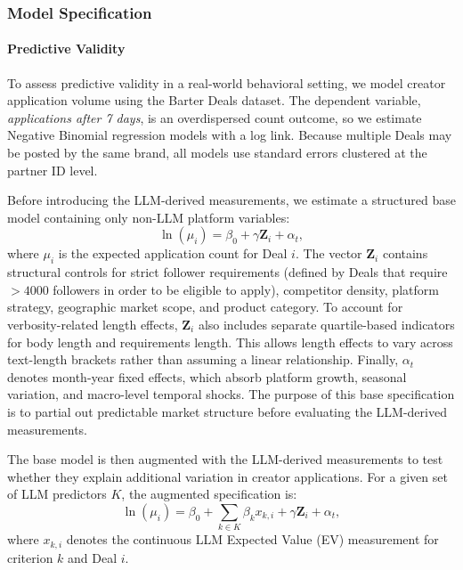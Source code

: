\subsubsection{Model Specification}

\paragraph{Predictive Validity}
To assess predictive validity in a real-world behavioral setting, we model creator application volume using the Barter Deals dataset. The dependent variable, \textit{applications after 7 days}, is an overdispersed count outcome, so we estimate Negative Binomial regression models with a log link. Because multiple Deals may be posted by the same brand, all models use standard errors clustered at the partner ID level.

Before introducing the LLM-derived measurements, we estimate a structured base model containing only non-LLM platform variables:
\begin{equation}\label{eq:barter_base_regression}
    \ln(\mu_i) = \beta_0 + \gamma \mathbf{Z}_i + \alpha_t,
\end{equation}
where $\mu_i$ is the expected application count for Deal $i$. The vector $\mathbf{Z}_i$ contains structural controls for strict follower requirements (defined by Deals that require $>4000$ followers in order to be eligible to apply), competitor density, platform strategy, geographic market scope, and product category. To account for verbosity-related length effects, $\mathbf{Z}_i$ also includes separate quartile-based indicators for body length and requirements length. This allows length effects to vary across text-length brackets rather than assuming a linear relationship. Finally, $\alpha_t$ denotes month-year fixed effects, which absorb platform growth, seasonal variation, and macro-level temporal shocks. The purpose of this base specification is to partial out predictable market structure before evaluating the LLM-derived measurements.



The base model is then augmented with the LLM-derived measurements to test whether they explain additional variation in creator applications. For a given set of LLM predictors $K$, the augmented specification is:
\begin{equation}\label{eq:barter_augmented_regression}
    \ln(\mu_i) = \beta_0 + \sum_{k \in K} \beta_k x_{k,i} + \gamma \mathbf{Z}_i + \alpha_t,
\end{equation}
where $x_{k,i}$ denotes the continuous LLM Expected Value (EV) measurement for criterion $k$ and Deal $i$.

